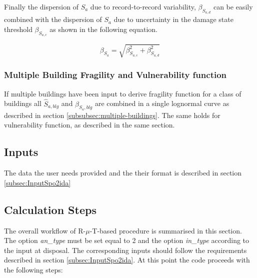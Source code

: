 Finally the dispersion of $S_{a}$ due to record-to-record variability, $\beta_{S_{a, d}}$ can be easily combined with the dispersion of $S_{a}$ due to uncertainty in the damage state threshold $\beta_{S_{a, c}}$ as shown in the following equation.

\begin{equation}
\label{eq:betatotal_DF}
\beta_{S_a} = \sqrt{\beta_{S_{a, c}}^2 + \beta_{S_{a, d}}^2}
\end{equation}

\subsubsection{Multiple Building Fragility and Vulnerability function}
\label{subsubsec:multiple-building-DF}
 If multiple buildings have been input to derive fragility function for a class of buildings all $\hat{S}_{a, blg}$ and $\beta_{S_a, blg}$ are combined in a single lognormal curve as described in section \ref{subsubsec:multiple-buildings}. The same holds for vulnerability function, as described in the same section.

\subsection{Inputs}
The data the user needs provided and the their format is described in section \ref{subsec:InputSpo2ida}

\subsection{Calculation Steps}
The overall workflow of R-$\mu$-T-based procedure is summarised in this section. The option \textit{an\_type} must be set equal to 2 and the option \textit{in\_type} according to the input at disposal. The corresponding inputs should follow the requirements described in section \ref{subsec:InputSpo2ida}. At this point the code proceeds with the following steps:

